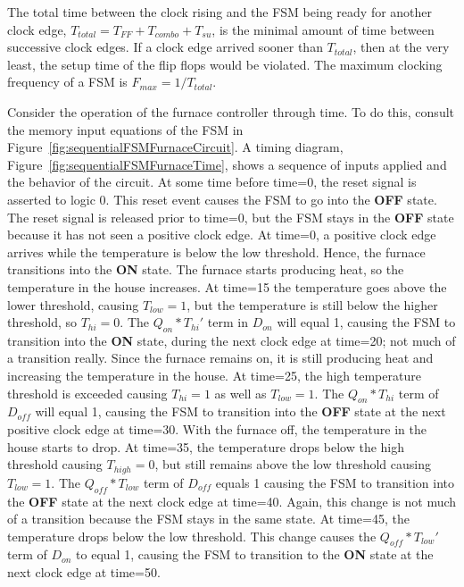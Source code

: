 The total time between the clock rising and the FSM being ready for another
clock edge, $T_{total} = T_{FF} + T_{combo} + T_{su}$,  is the minimal
amount of time between successive clock edges.  If a clock edge arrived
sooner than $T_{total}$, then at the very least, the setup time of the
flip flops would be violated.  The maximum clocking frequency
of a FSM is $F_{max} = 1/T_{total}$.

Consider the operation of the furnace controller through time.
To do this, consult the memory input equations of the
FSM in Figure~\ref{fig:sequentialFSMFurnaceCircuit}.  A timing diagram, Figure~\ref{fig:sequentialFSMFurnaceTime},
shows a sequence of inputs applied and the
behavior of the circuit. At some time before time=0, the reset signal is
asserted to logic 0.  This reset event causes the FSM to go into the
\textbf{ OFF} state.  The
reset signal is released prior to time=0, but the FSM stays in the \textbf{ OFF}
state because it has not seen a positive clock edge.  At time=0, a positive
clock edge arrives  while the
temperature is below the low threshold. Hence, the furnace transitions
into the \textbf{ ON} state.  The furnace starts producing heat, so the
temperature in the house increases. At
time=15 the temperature goes above the lower threshold, causing
$T_{low}=1$, but the temperature is still below the higher threshold, so $T_{hi}=0$.
The $Q_{on}*T_{hi}'$ term in $D_{on}$ will equal 1, causing the FSM
to transition into the \textbf{ ON} state, during the next clock edge at time=20;
not much of a transition really.  Since the furnace remains on, it is
still producing heat and increasing the temperature in the house.
At time=25, the high temperature threshold is exceeded causing
$T_{hi}=1$ as well as $T_{low}=1$.  The $Q_{on}*T_{hi}$ term of
$D_{off}$ will equal 1, causing the FSM to transition into the \textbf{ OFF}
state at the next positive clock edge at time=30.  With the furnace
off, the temperature in the house starts to drop.  At time=35, the
temperature drops below the high threshold causing $T_{high}=0$,
but still remains above the low threshold causing $T_{low}=1$.
The $Q_{off}*T_{low}$ term of $D_{off}$ equals 1 causing the
FSM to transition into the \textbf{ OFF} state at the next clock edge at
time=40.  Again, this change is not much of a transition because the FSM stays
in the same state.  At time=45, the temperature drops below the low
threshold.  This change causes the $Q_{off}*T_{low}'$ term of $D_{on}$ to
equal 1, causing the FSM to transition to the \textbf{ ON} state at the next
clock edge at time=50.

